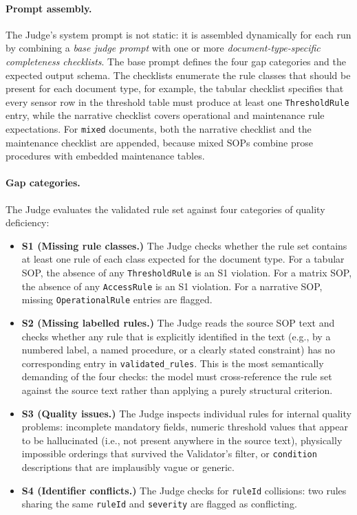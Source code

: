 ﻿\documentclass[11pt]{article}
\begin{document}
\paragraph{Prompt assembly.}
The Judge's system prompt is not static: it is assembled dynamically for each run
by combining a \emph{base judge prompt} with one or more \emph{document-type-specific
completeness checklists}.  The base prompt defines the four gap categories and the
expected output schema.  The checklists enumerate the rule classes that should be
present for each document type, for example, the tabular checklist specifies that
every sensor row in the threshold table must produce at least one
\texttt{ThresholdRule} entry, while the narrative checklist covers operational and
maintenance rule expectations.  For \texttt{mixed} documents, both the narrative
checklist and the maintenance checklist are appended, because mixed SOPs combine
prose procedures with embedded maintenance tables.

\paragraph{Gap categories.}
The Judge evaluates the validated rule set against four categories of quality
deficiency:

\begin{itemize}
    \item \textbf{S1 (Missing rule classes.)}
          The Judge checks whether the rule set contains at least one rule of each
          class expected for the document type.  For a tabular SOP, the absence of
          any \texttt{ThresholdRule} is an S1 violation.  For a matrix SOP, the
          absence of any \texttt{AccessRule} is an S1 violation.  For a narrative
          SOP, missing \texttt{OperationalRule} entries are flagged.

    \item \textbf{S2 (Missing labelled rules.)}
          The Judge reads the source SOP text and checks whether any rule that is
          explicitly identified in the text (e.g., by a numbered label, a named
          procedure, or a clearly stated constraint) has no corresponding entry
          in \texttt{validated\_rules}.  This is the most semantically demanding
          of the four checks: the model must cross-reference the rule set against
          the source text rather than applying a purely structural criterion.

    \item \textbf{S3 (Quality issues.)}
          The Judge inspects individual rules for internal quality problems:
          incomplete mandatory fields, numeric threshold values that appear to be
          hallucinated (i.e., not present anywhere in the source text), physically
          impossible orderings that survived the Validator's filter, or
          \texttt{condition} descriptions that are implausibly vague or generic.

    \item \textbf{S4 (Identifier conflicts.)}
          The Judge checks for \texttt{ruleId} collisions: two rules sharing the
          same \texttt{ruleId} and \texttt{severity} are flagged as conflicting.
\end{itemize}
\end{document}
